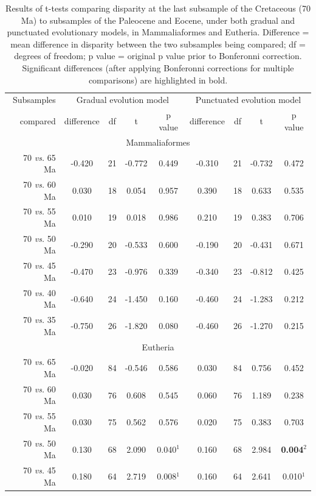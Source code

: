 \documentclass[12pt,letterpaper]{article}
\begin{document}
\begin{table}[ht]
\caption{\tiny{Results of t-tests comparing disparity at the last subsample of the Cretaceous (70 Ma) to subsamples of the Paleocene and Eocene, under both gradual and punctuated evolutionary models, in Mammaliaformes and Eutheria. Difference = mean difference in disparity between the two subsamples being compared; df = degrees of freedom; p value = original p value prior to Bonferonni correction. Significant differences (after applying Bonferonni corrections for multiple comparisons) are highlighted in bold.}}
\label{tab:Tab_beck}
\centering
\begin{tabular}{r|cccc|cccc}
  \hline
  Subsamples & \multicolumn{4}{c|}{Gradual evolution model} & \multicolumn{4}{c}{Punctuated evolution model} \\
  compared & difference & df & t & p value & difference & df & t & p value \\ 
  \hline
  \multicolumn{9}{c}{Mammaliaformes}\\
  \hline
  70 \textit{vs.} 65 Ma & -0.420 & 21 & -0.772 & 0.449 & -0.310 & 21 & -0.732 & 0.472 \\ 
  70 \textit{vs.} 60 Ma & 0.030 & 18 & 0.054 & 0.957 & 0.390 & 18 & 0.633 & 0.535 \\ 
  70 \textit{vs.} 55 Ma & 0.010 & 19 & 0.018 & 0.986 & 0.210 & 19 & 0.383 & 0.706 \\ 
  70 \textit{vs.} 50 Ma & -0.290 & 20 & -0.533 & 0.600 & -0.190 & 20 & -0.431 & 0.671 \\ 
  70 \textit{vs.} 45 Ma & -0.470 & 23 & -0.976 & 0.339 & -0.340 & 23 & -0.812 & 0.425 \\ 
  70 \textit{vs.} 40 Ma & -0.640 & 24 & -1.450 & 0.160 & -0.460 & 24 & -1.283 & 0.212 \\ 
  70 \textit{vs.} 35 Ma & -0.750 & 26 & -1.820 & 0.080 & -0.460 & 26 & -1.270 & 0.215 \\ 
  \hline
  \multicolumn{9}{c}{Eutheria}\\
  \hline
  70 \textit{vs.} 65 Ma & -0.020 & 84 & -0.546 & 0.586 & 0.030 & 84 & 0.756 & 0.452 \\ 
  70 \textit{vs.} 60 Ma &  0.030 & 76 & 0.608 & 0.545 & 0.060 & 76 & 1.189 & 0.238 \\ 
  70 \textit{vs.} 55 Ma &  0.030 & 75 & 0.562 & 0.576 & 0.020 & 75 & 0.383 & 0.703 \\ 
  70 \textit{vs.} 50 Ma &  0.130 & 68 & 2.090 & 0.040$^1$ & 0.160 & 68 & 2.984 & \textbf{0.004}$^2$ \\ 
  70 \textit{vs.} 45 Ma &  0.180 & 64 & 2.719 & 0.008$^1$ & 0.160 & 64 & 2.641 & 0.010$^1$ \\ 

\end{tabular}
\end{table}
\end{document}
